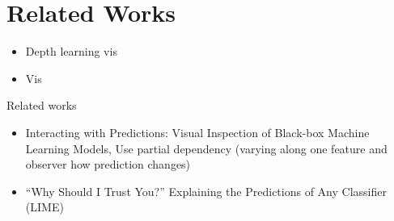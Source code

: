 \section{Related Works}

\begin{itemize}
    \item Depth learning vis
    \item Vis
\end{itemize}



Related works
\begin{itemize}
    \item Interacting with Predictions: Visual Inspection of Black-box Machine Learning Models,
    Use partial dependency (varying along one feature and observer how prediction changes)
    \item “Why Should I Trust You?” Explaining the Predictions of Any Classifier (LIME)

\end{itemize}
